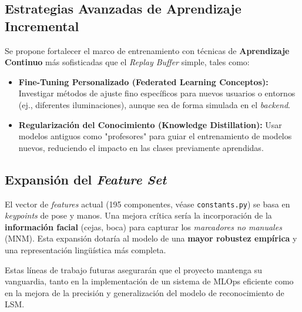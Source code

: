 \subsection{Estrategias Avanzadas de Aprendizaje Incremental}
\par Se propone fortalecer el marco de entrenamiento con técnicas de \textbf{Aprendizaje Continuo} más sofisticadas que el \textit{Replay Buffer} simple, tales como:
\begin{itemize}
    \item \textbf{Fine-Tuning Personalizado (Federated Learning Conceptos):} Investigar métodos de ajuste fino específicos para nuevos usuarios o entornos (ej., diferentes iluminaciones), aunque sea de forma simulada en el \textit{backend}.
    \item \textbf{Regularización del Conocimiento (Knowledge Distillation):} Usar modelos antiguos como "profesores" para guiar el entrenamiento de modelos nuevos, reduciendo el impacto en las clases previamente aprendidas.
\end{itemize}

\subsection{Expansión del \textit{Feature Set}}
\par El vector de \textit{features} actual (195 componentes, véase \lstinline|constants.py|) se basa en \textit{keypoints} de pose y manos. Una mejora crítica sería la incorporación de la \textbf{información facial} (cejas, boca) para capturar los \textit{marcadores no manuales} (MNM). Esta expansión dotaría al modelo de una \textbf{mayor robustez empírica} y una representación lingüística más completa.

\par Estas líneas de trabajo futuras asegurarán que el proyecto mantenga su vanguardia, tanto en la implementación de un sistema de MLOps eficiente como en la mejora de la precisión y generalización del modelo de reconocimiento de LSM.